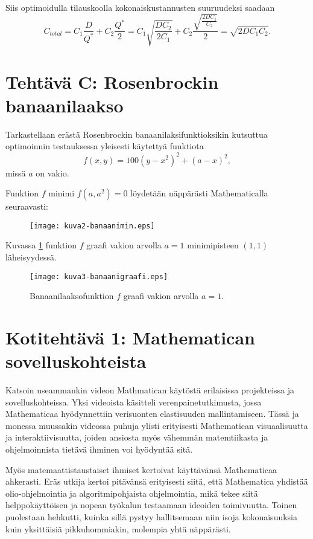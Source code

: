 \documentclass[a4paper,11pt]{article}
\begin{document}
{Siis optimoidulla tilauskoolla kokonaiskustannusten suuruudeksi saadaan
\begin{equation}
    C_{total} = C_1 \frac{D}{Q^*} + C_2 \frac{Q^*}{2} = C_1 \sqrt{\frac{DC_2}{2C_1}} + C_2 \frac{\sqrt{\frac{2DC_1}{C_2}}}{2} = \sqrt{2DC_1C_2}.
\end{equation}

\clearpage

\section{Tehtävä C: Rosenbrockin banaanilaakso}

Tarkastellaan erästä Rosenbrockin banaanilaksifunktioksikin kutsuttua optimoinnin testauksessa yleisesti käytettyä funktiota
\begin{equation}
    f(x,y)=100(y-x^2)^2+(a-x)^2,
\end{equation}
missä $a$ on vakio.

Funktion $f$ minimi $f(a,a^2)=0$ löydetään näppärästi Mathematicalla seuraavasti:
\begin{figure}[!htb]
    \texttt{[image: kuva2-banaanimin.eps]}
\end{figure}

Kuvassa \ref{fig:banana2} funktion $f$ graafi vakion arvolla $a=1$ minimipisteen $(1,1)$ läheisyydessä.
\begin{figure}[!htb]
    \centering
    \texttt{[image: kuva3-banaanigraafi.eps]}
    \caption{Banaanilaaksofunktion $f$ graafi vakion arvolla $a=1$.}
    \label{fig:banana2}
\end{figure}

\section{Kotitehtävä 1: Mathematican sovelluskohteista}

Katsoin useammankin videon Mathmatican käytöstä erilaisissa projekteissa ja sovelluskohteissa. Yksi videoista käsitteli verenpainetutkimusta, jossa Mathematicaa hyödynnettiin verisuonten elastisuuden mallintamiseen. Tässä ja monessa muussakin videossa puhuja ylisti erityisesti Mathematican visuaalisuutta ja interaktiivisuutta, joiden ansiosta myös vähemmän matemtiikasta ja ohjelmoinnista tietävä ihminen voi hyödyntää sitä.

Myös matemaattistaustaiset ihmiset kertoivat käyttävänsä Mathematicaa ahkerasti. Eräs utkija kertoi pitävänsä erityisesti siitä, että Mathematica yhdistää olio-ohjelmointia ja algoritmipohjaista ohjelmointia, mikä tekee siitä helppokäyttöisen ja nopean työkalun testaamaan ideoiden toimivuutta. Toinen puolestaan hehkutti, kuinka sillä pystyy hallitsemaan niin isoja kokonaisuuksia kuin yksittäisiä pikkuhommiakin, molempia yhtä näppärästi.

}
\end{document}
